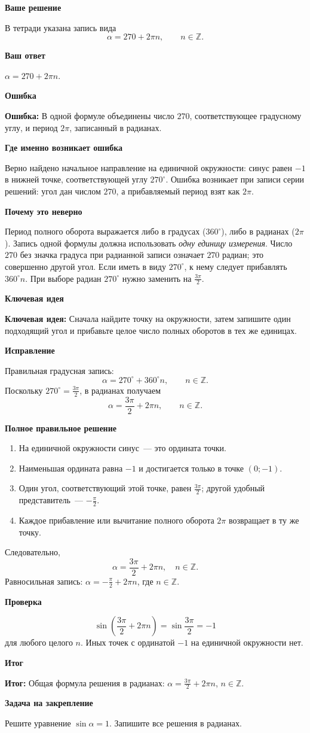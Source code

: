 \documentclass[a4paper,12pt]{article}
\newcommand{\rubric}[1]{\par\medskip\textbf{#1}\par\nobreak}
\newcommand{\err}[1]{\textcolor{errorred}{\textbf{Ошибка:}} #1}
\newcommand{\keyidea}[1]{\textcolor{accent}{\textbf{Ключевая идея:}} #1}
\newcommand{\outcome}[1]{\textcolor{accent}{\textbf{Итог:}} #1}
\begin{document}
\rubric{Ваше решение}
В тетради указана запись вида
\[\alpha=270+2\pi n,\qquad n\in\mathbb Z.\]
\rubric{Ваш ответ}
$\alpha=270+2\pi n$.

\rubric{Ошибка}
\err{В одной формуле объединены число $270$, соответствующее градусному углу, и период $2\pi$, записанный в радианах.}

\rubric{Где именно возникает ошибка}
Верно найдено начальное направление на единичной окружности: синус равен $-1$ в нижней точке, соответствующей углу $270^\circ$. Ошибка возникает при записи серии решений: угол дан числом $270$, а прибавляемый период взят как $2\pi$.

\rubric{Почему это неверно}
Период полного оборота выражается либо в градусах ($360^\circ$), либо в радианах ($2\pi$). Запись одной формулы должна использовать \emph{одну единицу измерения}. Число $270$ без значка градуса при радианной записи означает $270$ радиан; это совершенно другой угол. Если иметь в виду $270^\circ$, к нему следует прибавлять $360^\circ n$. При выборе радиан $270^\circ$ нужно заменить на $\frac{3\pi}{2}$.

\rubric{Ключевая идея}
\keyidea{Сначала найдите точку на окружности, затем запишите один подходящий угол и прибавьте целое число полных оборотов в тех же единицах.}

\rubric{Исправление}
Правильная градусная запись:
\[\alpha=270^\circ+360^\circ n,\qquad n\in\mathbb Z.\]
Поскольку $270^\circ=\frac{3\pi}{2}$, в радианах получаем
\[\alpha=\frac{3\pi}{2}+2\pi n,\qquad n\in\mathbb Z.\]

\rubric{Полное правильное решение}
\begin{enumerate}
\item На единичной окружности синус~--- это ордината точки.
\item Наименьшая ордината равна $-1$ и достигается только в точке $(0;-1)$.
\item Один угол, соответствующий этой точке, равен $\frac{3\pi}{2}$; другой удобный представитель~--- $-\frac{\pi}{2}$.
\item Каждое прибавление или вычитание полного оборота $2\pi$ возвращает в ту же точку.
\end{enumerate}
Следовательно,
\[\boxed{\alpha=\frac{3\pi}{2}+2\pi n,\quad n\in\mathbb Z.}\]
Равносильная запись: $\alpha=-\frac{\pi}{2}+2\pi n$, где $n\in\mathbb Z$.

\rubric{Проверка}
\[\sin\left(\frac{3\pi}{2}+2\pi n\right)
=\sin\frac{3\pi}{2}=-1\]
для любого целого $n$. Иных точек с ординатой $-1$ на единичной окружности нет.

\rubric{Итог}
\outcome{Общая формула решения в радианах: $\alpha=\frac{3\pi}{2}+2\pi n$, $n\in\mathbb Z$.}

\rubric{Задача на закрепление}
Решите уравнение $\sin\alpha=1$. Запишите все решения в радианах.
\end{document}
